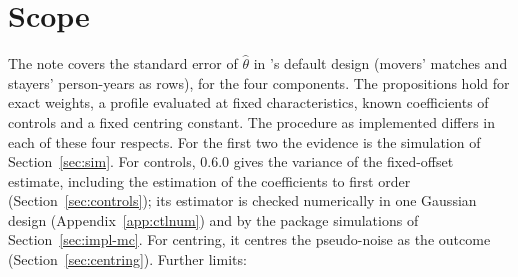 \section{Scope}\label{sec:scope}

The note covers the standard error of $\hat\theta$ in \fevc's default design (movers' matches and stayers'
person-years as rows), for the four components. The propositions hold for exact weights, a profile evaluated
at fixed characteristics, known coefficients of controls and a fixed centring constant. The procedure as
implemented differs in each of these four respects. For the first two the evidence is the simulation of
Section~\ref{sec:sim}. For controls, \fevc{} 0.6.0 gives the variance of the fixed-offset estimate, including the
estimation of the coefficients to first order (Section~\ref{sec:controls}); its estimator is checked numerically in
one Gaussian design (Appendix~\ref{app:ctlnum}) and by the package simulations of Section~\ref{sec:impl-mc}. For
centring, it centres the pseudo-noise as the outcome (Section~\ref{sec:centring}). Further limits:
